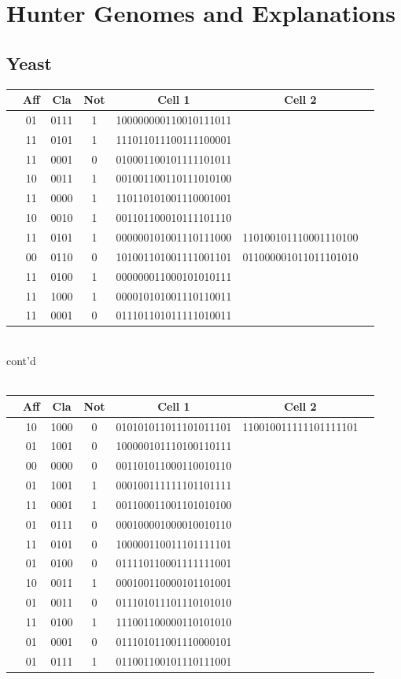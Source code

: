 \chapter{Hunter Genomes and Explanations}
\section{Yeast}
	\begin{tabular}{|c c c c c c c|}
		\hline
	&Aff & Cla & Not & Cell 1 &Cell 2&\\
	\hline
	&01&0111& 1 &100000000110010111011&&\\
	&11&0101& 1 &111011011100111100001&&\\
	&11&0001& 0 &010001100101111101011&&\\
	&10&0011& 1 &001001100110111010100&&\\
	&11&0000& 1 &110110101001110001001&&\\
	&10&0010& 1 &001101100010111101110&&\\
	&11&0101& 1 &000000101001110111000&110100101110001110100&\\
	&00&0110& 0 &101001101001111001101&011000001011011101010&\\
	&11&0100& 1 &000000011000101010111&&\\
	&11&1000& 1 &000010101001110110011&&\\
	&11&0001& 0 &011101101011111010011&&\\
\end{tabular} \\cont'd\\\\\pagebreak[4]
\begin{tabular}{|c c c c c c c|}
\hline
&Aff & Cla & Not & Cell 1 &Cell 2&\\
\hline	
	&10&1000& 0 &010101011011101011101&110010011111101111101&\\
	&01&1001& 0 &100000101110100110111&&\\
	&00&0000& 0 &001101011000110010110&&\\
	&01&1001& 1 &000100111111101101111&&\\

	&11&0001& 1 &001100011001101010100&&\\
	&01&0111& 0 &000100001000010010110&&\\
	&11&0101& 0 &100000110011101111101&&\\
	&01&0100& 0 &011110110001111111001&&\\
	&10&0011& 1 &000100110000101101001&&\\
	&01&0011& 0 &011101011101110101010&&\\
	&11&0100& 1 &111001100000110101010&&\\
	&01&0001& 0 &011101011001110000101&&\\
	&01&0111& 1 &011001100101110111001&&\\
	\hline
\end{tabular}


